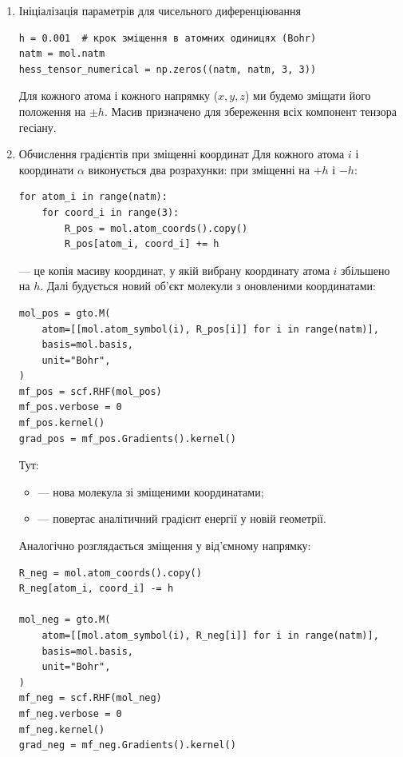 \begin{enumerate}
\item Ініціалізація параметрів для чисельного диференціювання
\begin{verbatim}
h = 0.001  # крок зміщення в атомних одиницях (Bohr)
natm = mol.natm
hess_tensor_numerical = np.zeros((natm, natm, 3, 3))
\end{verbatim}

Для кожного атома і кожного напрямку ($x, y, z$) ми будемо зміщати його положення на $\pm h$.
Масив  призначено для збереження всіх компонент тензора гесіану.


\item Обчислення градієнтів при зміщенні координат
Для кожного атома $i$ і координати $\alpha$ виконується два розрахунки: при зміщенні на $+h$ і $-h$:
\begin{verbatim}
for atom_i in range(natm):
    for coord_i in range(3):
        R_pos = mol.atom_coords().copy()
        R_pos[atom_i, coord_i] += h
\end{verbatim}
 --- це копія масиву координат, у якій вибрану координату атома $i$ збільшено на $h$.
Далі будується новий об’єкт молекули з оновленими координатами:

\begin{verbatim}
mol_pos = gto.M(
    atom=[[mol.atom_symbol(i), R_pos[i]] for i in range(natm)],
    basis=mol.basis,
    unit="Bohr",
)
mf_pos = scf.RHF(mol_pos)
mf_pos.verbose = 0
mf_pos.kernel()
grad_pos = mf_pos.Gradients().kernel()
\end{verbatim}
Тут:
\begin{itemize}
\item {} --- нова молекула зі зміщеними координатами;
\item {} --- повертає аналітичний градієнт енергії у новій геометрії.
\end{itemize}

Аналогічно розглядається зміщення у від’ємному напрямку:

\begin{verbatim}
R_neg = mol.atom_coords().copy()
R_neg[atom_i, coord_i] -= h

mol_neg = gto.M(
    atom=[[mol.atom_symbol(i), R_neg[i]] for i in range(natm)],
    basis=mol.basis,
    unit="Bohr",
)
mf_neg = scf.RHF(mol_neg)
mf_neg.verbose = 0
mf_neg.kernel()
grad_neg = mf_neg.Gradients().kernel()
\end{verbatim}


\end{enumerate}
